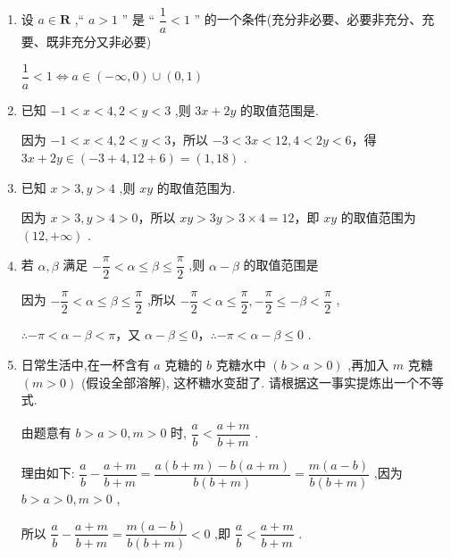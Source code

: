 \begin{enumerate}
\begin{jieda}
        由 $a > b$ ,得 $a - b > 0,{\left( a + \dfrac{1}{2}b\right) }^{2} + \dfrac{3}{4}{b}^{2} > 0$ ,因此 ${a}^{3} - {b}^{3} > 0,{a}^{3} > {b}^{3}$
    \end{jieda}
    \item 设 $a \in  \mathbf{R}$ ,“ $a > 1$ ” 是 “ $\dfrac{1}{a} < 1$ ” 的一个条件(充分非必要、必要非充分、充要、既非充分又非必要)
    \begin{jieda}
        $\dfrac{1}{a} < 1 \Longleftrightarrow a \in (-\infty, 0) \cup (0, 1)$
    \end{jieda}
    \item 已知 $- 1 < x < 4,2 < y < 3$ ,则 ${3x} + {2y}$ 的取值范围是.
    \begin{jieda}
        因为 $- 1 < x < 4,2 < y < 3$，所以 $- 3 < {3x} < {12},4 < {2y} < 6$，得 ${3x} + {2y} \in  \left( {-3 + 4,{12} + 6}\right)  = \left( {1,{18}}\right)$ .
    \end{jieda}
    \item 已知 $x > 3,y > 4$ ,则 ${xy}$ 的取值范围为.
    \begin{jieda}
        因为 $x > 3,y > 4 > 0$，所以 ${xy} > {3y} > 3 \times  4 = {12}$，即 ${xy}$ 的取值范围为 $\left( {{12}, + \infty }\right)$ .
    \end{jieda}
    \item 若 $\alpha ,\beta$ 满足 $- \dfrac{\pi }{2} < \alpha  \leq  \beta  \leq  \dfrac{\pi }{2}$ ,则 $\alpha  - \beta$ 的取值范围是\blkda[4]{$( - \pi ,0\rbrack$}
    \begin{jieda}
        因为 $- \dfrac{\pi }{2} < \alpha  \leq  \beta  \leq  \dfrac{\pi }{2}$ ,所以 $- \dfrac{\pi }{2} < \alpha  \leq  \dfrac{\pi }{2}, - \dfrac{\pi }{2} \leq   - \beta  < \dfrac{\pi }{2}$ ,
        
        $\therefore  - \pi  < \alpha  - \beta  < \pi$，又 $\alpha  - \beta  \leq  0$，$\therefore  - \pi  < \alpha  - \beta  \leq  0$ .
    \end{jieda}
    
    \item 日常生活中,在一杯含有 $a$ 克糖的 $b$ 克糖水中 $\left( {b > a > 0}\right)$ ,再加入 $m$ 克糖 $\left( {m > 0}\right)$ (假设全部溶解), 这杯糖水变甜了. 请根据这一事实提炼出一个不等式.
    \begin{jieda}
        由题意有 $b > a > 0,m > 0$ 时, $\dfrac{a}{b} < \dfrac{a + m}{b + m}$ .
        
        理由如下: $\dfrac{a}{b} - \dfrac{a + m}{b + m} = \dfrac{a\left( {b + m}\right)  - b\left( {a + m}\right) }{b\left( {b + m}\right) } = \dfrac{m\left( {a - b}\right) }{b\left( {b + m}\right) }$ ,因为 $b > a > 0,m > 0$ ,
        
        所以 $\dfrac{a}{b} - \dfrac{a + m}{b + m} = \dfrac{m\left( {a - b}\right) }{b\left( {b + m}\right) } < 0$ ,即 $\dfrac{a}{b} < \dfrac{a + m}{b + m}$ .
    \end{jieda}
\end{enumerate}

